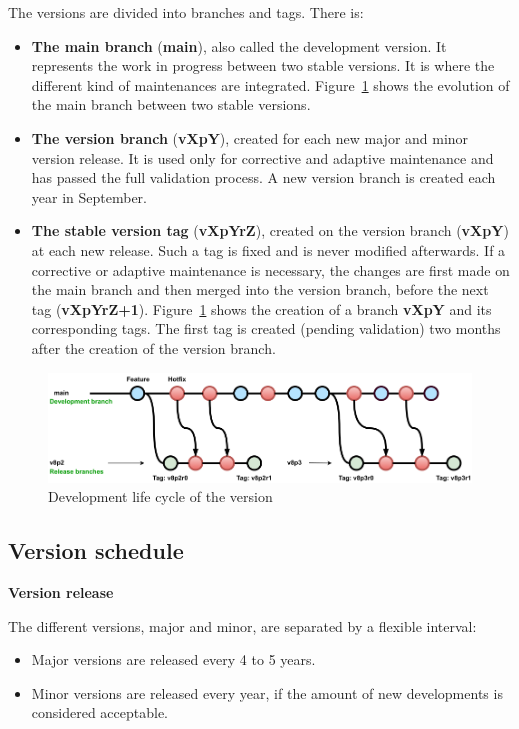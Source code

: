 The versions are divided into branches and tags. There is:
\begin{itemize}
\item \textbf{The main branch} (\textbf{main}), also called the development
  version. It represents the work in progress between two stable versions. It
  is where the different kind of maintenances are integrated.
  Figure~\ref{fig_lifecycle} shows the evolution of the main branch between two
  stable versions.
\item \textbf{The version branch} (\textbf{vXpY}), created for each new major
  and minor version release. It is used only for corrective and adaptive
  maintenance and has passed the full validation process. A new version branch
  is created each year in September.
\item \textbf{The stable version tag} (\textbf{vXpYrZ}), created on
  the version branch (\textbf{vXpY}) at each new release. Such a tag is fixed
  and is never modified afterwards. If a corrective or adaptive maintenance is
  necessary, the changes are first made on the main branch and then merged into
  the version branch, before the next tag (\textbf{vXpYrZ+1}).
  Figure~\ref{fig_lifecycle} shows the creation of a branch \textbf{vXpY} and
  its corresponding tags. The first tag is created (pending validation) two
  months after the creation of the version branch.
\end{itemize}

\begin{figure}[H]
\centering
\includegraphics[scale=.6]{graphics/dev-cycle.png}
\caption{\label{fig_lifecycle}Development life cycle of the \telemacsystem{} version}
\end{figure}

\subsection{Version schedule}

\textbf{Version release}

The different versions, major and minor, are separated by a flexible interval:
\begin{itemize}
\item Major versions are released every 4 to 5 years.
\item Minor versions are released every year, if the amount of new developments
  is considered acceptable.
\end{itemize}

